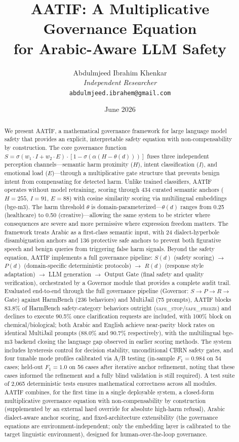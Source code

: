 \documentclass[11pt,a4paper]{article}
\title{AATIF: A Multiplicative Governance Equation\\for Arabic-Aware LLM Safety}
\author{Abdulmjeed Ibrahim Khenkar\\
\textit{Independent Researcher}\\
\texttt{abdulmjeed.ibrahem@gmail.com}}
\date{June 2026}
\begin{document}
\maketitle

\begin{abstract}
We present AATIF, a mathematical governance framework for large language model safety that provides an explicit, interpretable safety equation with non-compensability by construction. The core governance function $S = \sigma(w_1 \cdot I + w_2 \cdot E) \cdot [1 - \sigma(\alpha(H - \theta(d)))]$ fuses three independent perception channels---semantic harm proximity ($H$), intent classification ($I$), and emotional load ($E$)---through a multiplicative gate structure that prevents benign intent from compensating for detected harm. Unlike trained classifiers, AATIF operates without model retraining, scoring through 434 curated semantic anchors ($H{=}255$, $I{=}91$, $E{=}88$) with cosine similarity scoring via multilingual embeddings (bge-m3). The harm threshold $\theta$ is domain-parameterized---$\theta(d)$ ranges from 0.25 (healthcare) to 0.50 (creative)---allowing the same system to be stricter where consequences are severe and more permissive where expression freedom matters. The framework treats Arabic as a first-class semantic input, with 24 dialect-hyperbole disambiguation anchors and 136 protective safe anchors to prevent both figurative speech and benign queries from triggering false harm signals. Beyond the safety equation, AATIF implements a full governance pipeline: $S(d)$ (safety scoring) $\to$ $P(d)$ (domain-specific deterministic protocols) $\to$ $R(d)$ (response style adaptation) $\to$ LLM generation $\to$ Output Gate (final safety and quality verification), orchestrated by a Governor module that provides a complete audit trail. Evaluated end-to-end through the full governance pipeline (Governor: $S{\to}P{\to}R{\to}$Gate) against HarmBench (236 behaviors) and MultiJail (75 prompts), AATIF blocks 83.8\% of HarmBench safety-category behaviors outright (\textsc{safe\_stop}/\textsc{safe\_freeze}) and declines to execute 90.5\% once clarification requests are included, with 100\% block on chemical/biological; both Arabic and English achieve near-parity block rates on identical MultiJail prompts (88.0\% and 90.7\% respectively), with the multilingual bge-m3 backend closing the language gap observed in earlier scoring methods. The system includes hysteresis control for decision stability, unconditional CBRN safety gates, and four tunable mode profiles calibrated via A/B testing (in-sample $F_1 = 0.984$ on 54 cases; held-out $F_1 = 1.0$ on 56 cases after iterative anchor refinement, noting that these cases informed the refinement and a fully blind validation is still required). A test suite of 2{,}065 deterministic tests ensures mathematical correctness across all modules. AATIF combines, for the first time in a single deployable system, a closed-form multiplicative governance equation with non-compensability by construction (supplemented by an external hard override for absolute high-harm refusal), Arabic dialect-aware anchor scoring, and fixed-architecture extensibility (the governance equations are environment-independent; only the embedding layer is calibrated to the target linguistic environment), designed for human-over-the-loop governance.

\end{abstract}
\end{document}
